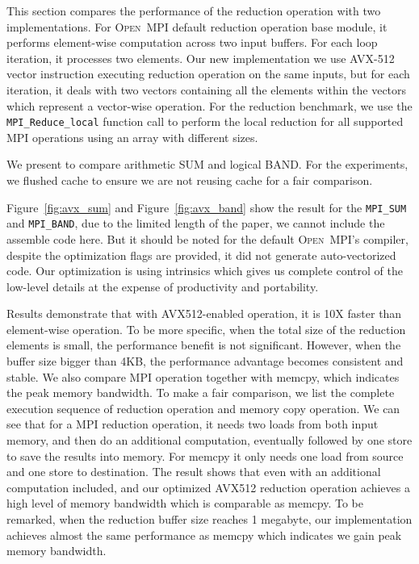 \documentclass[sigconf]{acmart}
\newcommand{\mpifunc}[1]{\lstinline"MPI_#1"\xspace}
\newcommand{\ompi}[0]{\textsc{Open~MPI}\xspace}
\newcommand{\mpi}[0]{\textsc{MPI}\xspace}
\begin{document}
This section compares the performance of the reduction operation with two
implementations.
For \ompi default reduction operation base module, it
performs element-wise computation across two input buffers. For each loop iteration,
it processes two elements. Our new implementation we use AVX-512 vector instruction
executing reduction operation on the same inputs, but for each iteration, it
deals with two vectors containing all the elements within the vectors which represent
a vector-wise operation.
For the reduction benchmark, we use the \mpifunc{Reduce_local} function call to
perform the local reduction for all supported MPI operations using an array with different sizes.

We present to compare arithmetic SUM and logical BAND.
For the experiments, we flushed cache to ensure we are not reusing cache for a fair comparison.

Figure~\ref{fig:avx_sum} and Figure~\ref{fig:avx_band} show the result for the
\mpifunc{SUM} and \mpifunc{BAND}, due to the limited length of the paper, we cannot
include the assemble code here. But it should be noted for the default \ompi's compiler, despite
the optimization flags are provided, it did not generate auto-vectorized code. Our optimization is
using intrinsics which gives us complete control of the low-level details
at the expense of productivity and portability.

Results demonstrate that with AVX512-enabled operation, it is 10X faster than element-wise operation.
To be more specific, when the total size of the reduction elements is small, the performance benefit is
not significant. However, when the buffer size bigger than 4KB, the performance advantage becomes consistent and stable.
We also compare MPI operation together with memcpy, which indicates the peak memory bandwidth.
To make a fair comparison, we list the complete execution sequence of reduction operation and memory copy operation.
We can see that for a \mpi reduction operation, it needs two loads from both input memory, and then do an additional computation, eventually followed by one store to save the results into memory. For memcpy it only needs one load from source and one store to destination.
The result shows that even with an additional computation included, and our optimized AVX512 reduction operation achieves
a high level of memory bandwidth which is comparable as memcpy.
To be remarked, when the reduction buffer size reaches 1 megabyte,
our implementation achieves almost the same performance as memcpy which indicates
we gain peak memory bandwidth.
\end{document}
